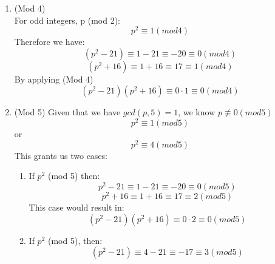 \documentclass[11pt]{article}
\newcounter{prnum}
\newenvironment{problem}{{\vskip 0.2in\noindent\bf Problem
       \addtocounter{prnum}{1} \arabic{prnum}.}}{\vskip 0.1in}
\begin{document}
\begin{problem}
\begin{enumerate}
    \begin{enumerate}
      \item (Mod 4)\\
    For odd integers, p  (mod 2):
    \begin{equation*}
      p^2 \equiv 1 (mod 4)
    \end{equation*}
    Therefore we have:
        \begin{equation*}
          (p^2 - 21)\equiv 1-21 \equiv -20 \equiv 0 (mod 4)
        \end{equation*}
        \begin{equation*}
          (p^2 +16)\equiv 1 + 16 \equiv 17 \equiv 1 (mod 4)
        \end{equation*}
        By applying (Mod 4)
        \begin{equation*}
          (p^2 - 21)(p^2 + 16) \equiv 0\cdot1 \equiv 0 (mod 4)
        \end{equation*}
      \item (Mod 5)
        Given that we have $gcd(p,5) = 1$, we know $p \not\equiv 0(mod 5)$
        \begin{equation*}
          p^2 \equiv 1 (mod 5)
        \end{equation*}
        or
        \begin{equation*}
         p^2 \equiv 4 (mod 5) 
        \end{equation*}
        This grants us two cases:
        \begin{enumerate}
          \item If $p^2$  (mod 5) then:\\
            \begin{equation*}
              p^2 - 21 \equiv 1 - 21 \equiv -20 \equiv 0 (mod 5)
            \end{equation*}
            \begin{equation*}
              p^2 + 16 \equiv 1 + 16 \equiv 17 \equiv 2(mod 5)
            \end{equation*}
            This case would result in:
            \begin{equation*}
              (p^2 - 21) (p^2 + 16) \equiv 0\cdot2\equiv 0(mod 5)
            \end{equation*}
          \item If $p^2$  (mod 5), then:\\
            \begin{equation*}
              (p^2 - 21) \equiv 4 - 21 \equiv -17 \equiv 3 (mod 5)
            \end{equation*}

\end{enumerate}
\end{enumerate}
\end{enumerate}
\end{problem}
\end{document}
